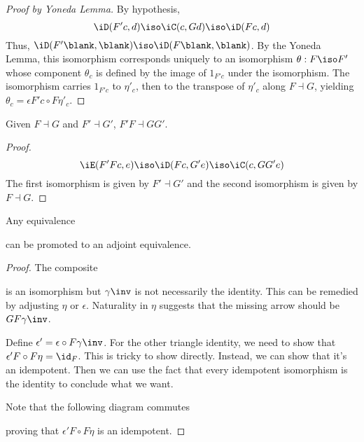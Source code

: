 \documentclass{amsart}
\begin{document}
\begin{proof}[Proof by Yoneda Lemma]
  By hypothesis,
  \[
    \iD(F'c,d) \iso \iC(c,Gd) \iso \iD(Fc,d)
  \]
  Thus, $\iD(F'\blank,\blank) \iso \iD(F\blank,\blank)$.
  By the Yoneda Lemma, this isomorphism corresponds uniquely to an isomorphism $\theta : F \iso F'$ whose component $\theta_{c}$ is defined by the image of $1_{F'c}$ under the isomorphism.
  The isomorphism carries $1_{F'c}$ to $\eta'_{c}$, then to the transpose of $\eta'_{c}$ along $F \dashv G$, yielding $\theta_{c} = \epsilon F'c \circ F\eta'_{c}$.
\end{proof}

\begin{lem}
  Given $F \dashv G$ and $F' \dashv G'$, $F'F \dashv GG'$.
  
\end{lem}
\begin{proof}
  \[
    \iE(F'Fc,e) \iso \iD(Fc,G'e) \iso \iC(c,GG'e)
  \]
  The first isomorphism is given by $F' \dashv G'$ and the second isomorphism is given by $F \dashv G$.
\end{proof}

\begin{lem}
  Any equivalence
  can be promoted to an adjoint equivalence.
\end{lem}
\begin{proof}
  The composite
  
  is an isomorphism but $\gamma\inv$ is not necessarily the identity.
  This can be remedied by adjusting $\eta$ or $\epsilon$.
  Naturality in $\eta$ suggests that the missing arrow should be $GF\gamma\inv$.
  
  Define $\epsilon' = \epsilon \circ F\gamma\inv$.
  For the other triangle identity, we need to show that $\epsilon'F \circ F\eta = \id_{F}$.
  This is tricky to show directly.
  Instead, we can show that it's an idempotent.
  Then we can use the fact that every idempotent isomorphism is the identity to conclude what we want.

  Note that the following diagram commutes
  
  proving that $\epsilon'F \circ F\eta$ is an idempotent.
\end{proof}



\end{document}

